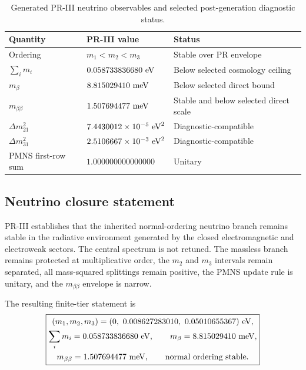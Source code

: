 \documentclass[11pt]{article}
\begin{document}
\begin{table}[htbp]
\centering
\caption{Generated PR-III neutrino observables and selected post-generation diagnostic status.}
\label{tab:priii-neutrino-summary}
\begin{tabular}{lll}
\toprule
\textbf{Quantity} & \textbf{PR-III value} & \textbf{Status} \\
\midrule
Ordering & \(m_1<m_2<m_3\) & Stable over PR envelope \\
\(\sum_i m_i\) & \(0.058733836680\ {\rm eV}\) & Below selected cosmology ceiling \\
\(m_\beta\) & \(8.815029410\ {\rm meV}\) & Below selected direct bound \\
\(m_{\beta\beta}\) & \(1.507694477\ {\rm meV}\) & Stable and below selected direct scale \\
\(\Delta m_{21}^2\) & \(7.4430012\times10^{-5}\ {\rm eV}^2\) & Diagnostic-compatible \\
\(\Delta m_{31}^2\) & \(2.5106667\times10^{-3}\ {\rm eV}^2\) & Diagnostic-compatible \\
PMNS first-row sum & \(1.000000000000000\) & Unitary \\
\bottomrule
\end{tabular}
\end{table}

\subsection{Neutrino closure statement}
\label{subsec:priii-neutrino-closure-statement}

PR-III establishes that the inherited normal-ordering neutrino branch remains stable in the radiative environment generated by the closed electromagnetic and electroweak sectors.  The central spectrum is not retuned.  The massless branch remains protected at multiplicative order, the \(m_2\) and \(m_3\) intervals remain separated, all mass-squared splittings remain positive, the PMNS update rule is unitary, and the \(m_{\beta\beta}\) envelope is narrow.

The resulting finite-tier statement is
\begin{equation}
\boxed{
\begin{gathered}
(m_1,m_2,m_3)
=
(0,\ 0.008627283010,\ 0.05010655367)\ {\rm eV},
\\
\sum_i m_i
=
0.058733836680\ {\rm eV},
\qquad
m_\beta
=
8.815029410\ {\rm meV},
\\
m_{\beta\beta}
=
1.507694477\ {\rm meV},
\qquad
\text{normal ordering stable.}
\end{gathered}
}
\end{equation}
\end{document}
